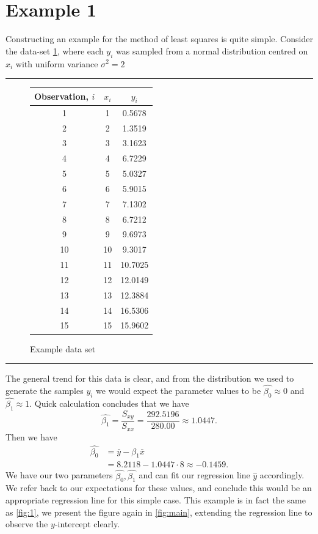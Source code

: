 \documentclass[10pt,a4paper, twocolumn, conference]{IEEEtran}
\begin{document}
\section{Example 1}
Constructing an example for the method of least squares is quite simple. Consider the data-set \cref{fig:dat}, where each $y_i$ was sampled from a normal distribution centred on $x_i$ with uniform variance $\sigma^2 = 2$
\vspace{2mm}
\hrule
\begin{figure}[H]
\centering
\begin{tabular}{c|c|c}
Observation, $i$ & $x_i$ & $y_i$ \\
\hline
\hline
1 &1&0.5678 \\
2 &2&1.3519 \\
3 &3&3.1623 \\
4 &4&6.7229 \\
5 &5&5.0327 \\
6 &6&5.9015 \\
7 &7&7.1302 \\
8 &8&6.7212 \\
9 &9&9.6973 \\
10 &10&9.3017 \\
11 &11&10.7025 \\
12 &12&12.0149 \\
13 &13&12.3884 \\
14 &14& 16.5306\\
15 &15&15.9602 \\
\end{tabular}
\caption{\small{Example data set}}
\label{fig:dat}
\end{figure}
\hrule
\vspace{2mm}
The general trend for this data is clear, and from the distribution we used to generate the samples $y_i$ we would expect the parameter values to be $\hat{\beta_0} \approx 0$ and $\hat{\beta_1} \approx 1$. Quick calculation concludes that we have
\begin{equation}
\hat{\beta_1} = \frac{S_{xy}}{S_{xx}} = \frac{292.5196}{280.00} \approx 1.0447.
\end{equation}
Then we have
\begin{align} \nonumber
\hat{\beta_0} & = \bar{y} - \beta_1 \bar{x} \\
 & = 8.2118 - 1.0447 \cdot 8  \approx -0.1459.
\end{align}
We have our two parameters $\hat{\beta_0}, \hat{\beta_1}$ and can fit our regression line $\hat{y}$ accordingly. We refer back to our expectations for these values, and conclude this would be an appropriate regression line for this simple case. This example is in fact the same as \cref{fig:1}, we present the figure again in \cref{fig:main}, extending the regression line to observe the $y$-intercept clearly.
\end{document}
